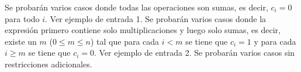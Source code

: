 \documentclass{oci}
\begin{document}
\begin{scoreDescription}
   Se probarán varios casos donde todas las operaciones son sumas, es decir,
  $c_i = 0$ para todo $i$.
  Ver ejemplo de entrada 1.
   Se probarán varios casos donde la expresión primero contiene solo
  multiplicaciones y luego solo sumas, es decir, existe un $m$ ($0 \leq m \leq
  n$) tal que para cada $i < m$ se tiene que $c_i = 1$ y para cada $i \geq m$
  se tiene que $c_i = 0$.
  Ver ejemplo de entrada 2. 
   Se probarán varios casos sin restricciones adicionales.
\end{scoreDescription}

\begin{sampleDescription}
\end{sampleDescription}
\end{document}
